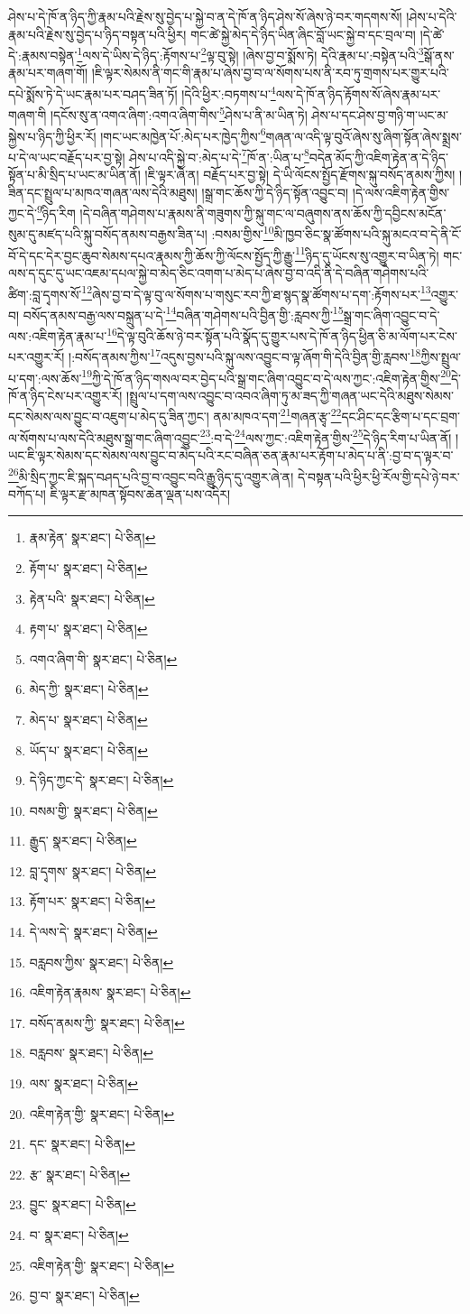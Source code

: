 ཤེས་པ་དེ་ཁོ་ན་ཉིད་ཀྱི་རྣམ་པའི་རྗེས་སུ་བྱེད་པ་སྐྱེ་བ་ན་དེ་ཁོ་ན་ཉིད་ཤེས་སོ་ཞེས་ཉེ་བར་གདགས་སོ། །ཤེས་པ་དེའི་རྣམ་པའི་རྗེས་སུ་བྱེད་པ་ཉིད་བསྟན་པའི་ཕྱིར། གང་ཚེ་སྐྱེ་མེད་དེ་ཉིད་ཡིན་ཞིང་བློ་ཡང་སྐྱེ་བ་དང་བྲལ་བ། །དེ་ཚེ་དེ་:རྣམས་བསྟེན་\footnote{རྣམ་རྟེན་  སྣར་ཐང་།  པེ་ཅིན། }ལས་དེ་ཡིས་དེ་ཉིད་:རྟོགས་པ་\footnote{རྟོག་པ་  སྣར་ཐང་།  པེ་ཅིན། }ལྟ་བུ་སྟེ། །ཞེས་བྱ་བ་སྨོས་ཏེ། དེའི་རྣམ་པ་:བསྟེན་པའི་\footnote{རྟེན་པའི་  སྣར་ཐང་།  པེ་ཅིན། }སྒོ་ནས་རྣམ་པར་གཞག་གོ། །ཇི་ལྟར་སེམས་ནི་གང་གི་རྣམ་པ་ཞེས་བྱ་བ་ལ་སོགས་པས་ནི་རབ་ཏུ་གྲགས་པར་གྱུར་པའི་དཔེ་སྨོས་ཏེ་དེ་ཡང་རྣམ་པར་བཤད་ཟིན་ཏོ། །དེའི་ཕྱིར་:བཏགས་པ་\footnote{རྟག་པ་  སྣར་ཐང་།  པེ་ཅིན། }ལས་དེ་ཁོ་ན་ཉིད་རྟོགས་སོ་ཞེས་རྣམ་པར་གཞག་གི །དངོས་སུ་ན་འགའ་ཞིག་:འགའ་ཞིག་གིས་\footnote{འགའ་ཞིག་གི་  སྣར་ཐང་།  པེ་ཅིན། }ཤེས་པ་ནི་མ་ཡིན་ཏེ། ཤེས་པ་དང་ཤེས་བྱ་གཉི་ག་ཡང་མ་སྐྱེས་པ་ཉིད་ཀྱི་ཕྱིར་རོ། །གང་ཡང་མཁྱེན་པོ་:མེད་པར་ཁྱེད་ཀྱིས་\footnote{མེད་ཀྱི་  སྣར་ཐང་།  པེ་ཅིན། }གཞན་ལ་འདི་ལྟ་བུའོ་ཞེས་སུ་ཞིག་སྟོན་ཞེས་སྨྲས་པ་དེ་ལ་ཡང་བརྗོད་པར་བྱ་སྟེ། ཤེས་པ་འདི་སྐྱེ་བ་:མེད་པ་དེ་\footnote{མེད་པ་  སྣར་ཐང་།  པེ་ཅིན། }ཁོ་ན་:ཡིན་པ་\footnote{ཡོད་པ་  སྣར་ཐང་།  པེ་ཅིན། }བདེན་མོད་ཀྱི་འཇིག་རྟེན་ན་དེ་ཉིད་སྟོན་པ་མི་སྲིད་པ་ཡང་མ་ཡིན་ནོ། །ཇི་ལྟར་ཞེ་ན། བརྗོད་པར་བྱ་སྟེ། དེ་ཡི་ལོངས་སྤྱོད་རྫོགས་སྐུ་བསོད་ནམས་ཀྱིས། །ཟིན་དང་སྤྲུལ་པ་མཁའ་གཞན་ལས་དེའི་མཐུས། །སྒྲ་གང་ཆོས་ཀྱི་དེ་ཉིད་སྟོན་འབྱུང་བ། །དེ་ལས་འཇིག་རྟེན་གྱིས་ཀྱང་དེ་\footnote{དེ་ཉིད་ཀྱང་དེ་  སྣར་ཐང་།  པེ་ཅིན། }ཉིད་རིག །དེ་བཞིན་གཤེགས་པ་རྣམས་ནི་གཟུགས་ཀྱི་སྐུ་གང་ལ་བཞུགས་ནས་ཆོས་ཀྱི་དབྱིངས་མངོན་སུམ་དུ་མཛད་པའི་སྐུ་བསོད་ནམས་བརྒྱས་ཟིན་པ། :བསམ་གྱིས་\footnote{བསམ་གྱི་  སྣར་ཐང་།  པེ་ཅིན། }མི་ཁྱབ་ཅིང་སྣ་ཚོགས་པའི་སྐུ་མངའ་བ་དེ་ནི་ངོ་བོ་དེ་དང་དེར་བྱང་ཆུབ་སེམས་དཔའ་རྣམས་ཀྱི་ཆོས་ཀྱི་ལོངས་སྤྱོད་ཀྱི་རྒྱུ་\footnote{རྒྱུད་  སྣར་ཐང་།  པེ་ཅིན། }ཉིད་དུ་ཡོངས་སུ་འགྱུར་བ་ཡིན་ཏེ། གང་ལས་ད་དུང་དུ་ཡང་འཇམ་དཔལ་སྐྱེ་བ་མེད་ཅིང་འགག་པ་མེད་པ་ཞེས་བྱ་བ་འདི་ནི་དེ་བཞིན་གཤེགས་པའི་ཚིག་:བླ་དྭགས་སོ་\footnote{བླ་དྭགས་  སྣར་ཐང་།  པེ་ཅིན། }ཞེས་བྱ་བ་དེ་ལྟ་བུ་ལ་སོགས་པ་གསུང་རབ་ཀྱི་ཐ་སྙད་སྣ་ཚོགས་པ་དག་:རྟོགས་པར་\footnote{རྟོག་པར་  སྣར་ཐང་།  པེ་ཅིན། }འགྱུར་བ། བསོད་ནམས་བརྒྱ་ལས་བསྐྲུན་པ་དེ་\footnote{དེ་ལས་དེ་  སྣར་ཐང་།  པེ་ཅིན། }བཞིན་གཤེགས་པའི་བྱིན་གྱི་:རླབས་ཀྱི་\footnote{བརླབས་ཀྱིས་  སྣར་ཐང་།  པེ་ཅིན། }སྒྲ་གང་ཞིག་འབྱུང་བ་དེ་ལས་:འཇིག་རྟེན་རྣམ་པ་\footnote{འཇིག་རྟེན་རྣམས་  སྣར་ཐང་།  པེ་ཅིན། }དེ་ལྟ་བུའི་ཆོས་ཉེ་བར་སྟོན་པའི་སྣོད་དུ་གྱུར་པས་དེ་ཁོ་ན་ཉིད་ཕྱིན་ཅི་མ་ལོག་པར་ངེས་པར་འགྱུར་རོ། །:བསོད་ནམས་ཀྱིས་\footnote{བསོད་ནམས་ཀྱི་  སྣར་ཐང་།  པེ་ཅིན། }འདུས་བྱས་པའི་སྐུ་ལས་འབྱུང་བ་ལྟ་ཞོག་གི་དེའི་བྱིན་གྱི་རླབས་\footnote{བརླབས་  སྣར་ཐང་།  པེ་ཅིན། }ཀྱིས་སྤྲུལ་པ་དག་:ལས་ཆོས་\footnote{ལས་  སྣར་ཐང་།  པེ་ཅིན། }ཀྱི་དེ་ཁོ་ན་ཉིད་གསལ་བར་བྱེད་པའི་སྒྲ་གང་ཞིག་འབྱུང་བ་དེ་ལས་ཀྱང་:འཇིག་རྟེན་གྱིས་\footnote{འཇིག་རྟེན་གྱི་  སྣར་ཐང་།  པེ་ཅིན། }དེ་ཁོ་ན་ཉིད་ངེས་པར་འགྱུར་རོ། །སྤྲུལ་པ་དག་ལས་འབྱུང་བ་འབའ་ཞིག་ཏུ་མ་ཟད་ཀྱི་གཞན་ཡང་དེའི་མཐུས་སེམས་དང་སེམས་ལས་བྱུང་བ་འཇུག་པ་མེད་དུ་ཟིན་ཀྱང་། ནམ་མཁའ་དག་\footnote{དང་  སྣར་ཐང་།  པེ་ཅིན། }གཞན་རྩྭ་\footnote{རྩ་  སྣར་ཐང་།  པེ་ཅིན། }དང་ཤིང་དང་རྩིག་པ་དང་བྲག་ལ་སོགས་པ་ལས་དེའི་མཐུས་སྒྲ་གང་ཞིག་འབྱུང་\footnote{བྱུང་  སྣར་ཐང་།  པེ་ཅིན། }:བ་དེ་\footnote{བ་  སྣར་ཐང་།  པེ་ཅིན། }ལས་ཀྱང་:འཇིག་རྟེན་གྱིས་\footnote{འཇིག་རྟེན་གྱི་  སྣར་ཐང་།  པེ་ཅིན། }དེ་ཉིད་རིག་པ་ཡིན་ནོ། །ཡང་ཇི་ལྟར་སེམས་དང་སེམས་ལས་བྱུང་བ་མེད་པའི་རང་བཞིན་ཅན་རྣམ་པར་རྟོག་པ་མེད་པ་ནི་:བྱ་བ་ད་ལྟར་བ་\footnote{བྱ་བ་  སྣར་ཐང་།  པེ་ཅིན། }མི་སྲིད་ཀྱང་ཇི་སྐད་བཤད་པའི་བྱ་བ་འབྱུང་བའི་རྒྱུ་ཉིད་དུ་འགྱུར་ཞེ་ན། དེ་བསྟན་པའི་ཕྱིར་ཕྱི་རོལ་གྱི་དཔེ་ཉེ་བར་བཀོད་པ། ཇི་ལྟར་རྫ་མཁན་སྟོབས་ཆེན་ལྡན་པས་འདིར། 